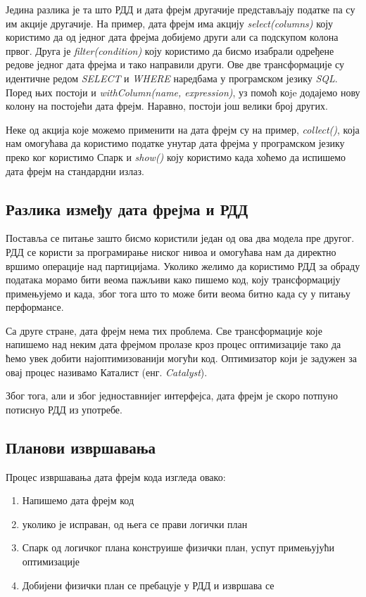\documentclass[12pt,oneside]{memoir}
\begin{document}
Једина разлика је та што РДД и дата фрејм другачије представљају податке па су им акције другачије. На пример, дата фрејм има акцију \textit{select(columns)} коју користимо да од једног дата фрејма добијемо други али са подскупом колона првог. Друга је \textit{filter(condition)} коју користимо да бисмо изабрали одређене редове једног дата фрејма и тако направили други. Ове две трансформације су идентичне редом \textit{SELECT} и \textit{WHERE} наредбама у програмском језику \textit{SQL}. Поред њих постоји и \textit{withColumn(name, expression)}, уз помоћ коje додајемо нову колону на постојећи дата фрејм. Наравно, постоји још велики број других. \cite{spark_guide}

Неке од акција које можемо применити на дата фрејм су на пример, \textit{collect()}, која нам омогућава да користимо податке унутар дата фрејма у програмском језику преко ког користимо Спарк и \textit{show()} коју користимо када хоћемо да испишемо дата фрејм на стандардни излаз. \cite{spark_guide}

\subsection{Разлика између дата фрејма и РДД}
\label{subsec:spark_df_vs_rdd}

Поставља се питање зашто бисмо користили један од ова два модела пре другог. РДД се користи за програмирање ниског нивоа и омогућава нам да директно вршимо операције над партицијама. Уколико желимо да користимо РДД за обраду података морамо бити веома пажљиви како пишемо код, коју трансформацију примењујемо и када, због тога што то може бити веома битно када су у питању перформансе. \cite{spark_guide}

Са друге стране, дата фрејм нема тих проблема. Све трансформације које напишемо над неким дата фрејмом пролазе кроз процес оптимизације тако да ћемо увек добити најоптимизованији могући код. Оптимизатор који је задужен за овај процес називамо Каталист (енг. \textit{Catalyst}). \cite{spark_guide}

Због тога, али и због једноставнијег интерфејса, дата фрејм је скоро потпуно потиснуо РДД из употребе.

\subsection{Планови извршавања}
\label{subsec:spark_exec_plans}

Процес извршавања дата фрејм кода изгледа овако:
\begin{enumerate}
\item Напишемо дата фрејм код
\item уколико је исправан, од њега се прави логички план
\item Спарк од логичког плана конструише физички план, успут примењујући оптимизације
\item Добијени физички план се пребацује у РДД и извршава се
\end{enumerate}
\end{document}
